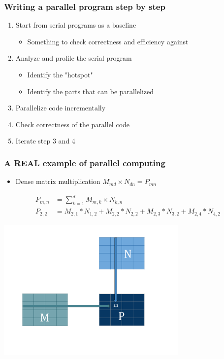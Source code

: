 \documentclass[10pt,t]{beamer}
\begin{document}
\begin{frame}
\frametitle{Writing a parallel program step by step}
\begin{enumerate}
\item Start from serial programs as a baseline
\begin{itemize}
\item Something to check correctness and efficiency against
\end{itemize}
\item Analyze and profile the serial program
\begin{itemize}
\item Identify the "hotspot"
\item Identify the parts that can be parallelized
\end{itemize}
\item Parallelize code incrementally
\item Check correctness of the parallel code
\item Iterate step 3 and 4
\end{enumerate}
\end{frame}


\begin{frame}
\frametitle{A REAL example of parallel computing}
\begin{itemize}
\item Dense matrix multiplication $M_{md}\times{}N_{dn}=P_{mn}$
\end{itemize}
\begin{align*}
P_{m,n} &= \sum_{k=1}^{d}M_{m,k}\times{}N_{k,n}\\
P_{2,2} &= M_{2,1}*N_{1,2}+M_{2,2}*N_{2,2}+M_{2,3}*N_{3,2}+M_{2,4}*N_{4,2}
\end{align*}
\begin{center}
\includegraphics[width=0.7\textwidth]{./MatMul}
\end{center}
\end{frame}
\end{document}
